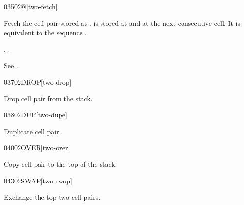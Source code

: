 \begin{worddef}{0350}{2@}[two-fetch]
\item {}

	Fetch the cell pair  stored at .
	 is stored at  and  at the
	next consecutive cell. It is equivalent to the sequence
	    .

\see {},
	.

	\begin{testing} %
		See .
	\end{testing}
\end{worddef}


\begin{worddef}{0370}{2DROP}[two-drop]
\item {}

	Drop cell pair  from the stack.

	\begin{testing} %
	\end{testing}
\end{worddef}


\begin{worddef}{0380}{2DUP}[two-dupe]
\item {}

	Duplicate cell pair .

	\begin{testing} %
	\end{testing}
\end{worddef}


\begin{worddef}{0400}{2OVER}[two-over]
\item {}

	Copy cell pair  to the top of the stack.

	\begin{testing} %
	\end{testing}
\end{worddef}


\begin{worddef}{0430}{2SWAP}[two-swap]
\item {}

	Exchange the top two cell pairs.

	\begin{testing} %
	\end{testing}
\end{worddef}



